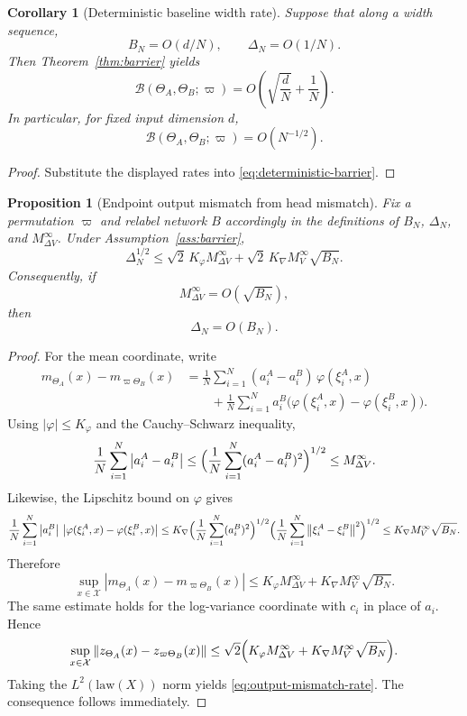 \documentclass[11pt]{article}
\newtheorem{proposition}[theorem]{Proposition}
\newtheorem{corollary}[theorem]{Corollary}
\theoremstyle{definition}
\newcommand{\norm}[1]{\left\lVert #1 \right\rVert}
\newcommand{\abs}[1]{\left\lvert #1 \right\rvert}
\newcommand{\mc}[1]{\mathcal{#1}}
\newcommand{\cB}{\mathcal{B}}
\begin{document}
\begin{corollary}[Deterministic baseline width rate]
\label{cor:baseline-width-rate}
Suppose that along a width sequence,
\[
  B_N=O(d/N),
  \qquad
  \Delta_N=O(1/N).
\]
Then Theorem~\ref{thm:barrier} yields
\[
  \cB(\Theta_A,\Theta_B;\varpi)
  =
  O\!\left(\sqrt{\frac{d}{N}}+\frac1N\right).
\]
In particular, for fixed input dimension $d$,
\[
  \cB(\Theta_A,\Theta_B;\varpi)=O(N^{-1/2}).
\]
\end{corollary}

\begin{proof}
Substitute the displayed rates into \eqref{eq:deterministic-barrier}.
\end{proof}

\begin{proposition}[Endpoint output mismatch from head mismatch]
\label{prop:output-mismatch-rate}
Fix a permutation $\varpi$ and relabel network $B$ accordingly in the
definitions of $B_N$, $\Delta_N$, and $M_{\Delta V}^\infty$. Under
Assumption~\ref{ass:barrier},
\begin{equation}
  \Delta_N^{1/2}
  \le
  \sqrt{2}\,K_\varphi M_{\Delta V}^\infty
  +
  \sqrt{2}\,K_{\nabla}M_V^\infty\sqrt{B_N}.
  \label{eq:output-mismatch-rate}
\end{equation}
Consequently, if
\[
  M_{\Delta V}^\infty=O(\sqrt{B_N}),
\]
then
\[
  \Delta_N=O(B_N).
\]
\end{proposition}

\begin{proof}
For the mean coordinate, write
\begin{align*}
  m_{\Theta_A}(x)-m_{\varpi\Theta_B}(x)
  &=
  \frac1N\sum_{i=1}^N
  (a_i^A-a_i^B)\,\varphi(\xi_i^A,x)
  \\
  &\qquad+
  \frac1N\sum_{i=1}^N
  a_i^B\bigl(\varphi(\xi_i^A,x)-\varphi(\xi_i^B,x)\bigr).
\end{align*}
Using $\abs{\varphi}\le K_\varphi$ and the Cauchy--Schwarz inequality,
\[
  \frac1N\sum_{i=1}^N \abs{a_i^A-a_i^B}
  \le
  \Bigl(\frac1N\sum_{i=1}^N (a_i^A-a_i^B)^2\Bigr)^{1/2}
  \le
  M_{\Delta V}^\infty.
\]
Likewise, the Lipschitz bound on $\varphi$ gives
\[
  \frac1N\sum_{i=1}^N
  \abs{a_i^B}\,\abs{\varphi(\xi_i^A,x)-\varphi(\xi_i^B,x)}
  \le
  K_{\nabla}
  \Bigl(\frac1N\sum_{i=1}^N (a_i^B)^2\Bigr)^{1/2}
  \Bigl(\frac1N\sum_{i=1}^N \norm{\xi_i^A-\xi_i^B}^2\Bigr)^{1/2}
  \le
  K_{\nabla}M_V^\infty\sqrt{B_N}.
\]
Therefore
\[
  \sup_{x\in\mc{X}}
  \abs{m_{\Theta_A}(x)-m_{\varpi\Theta_B}(x)}
  \le
  K_\varphi M_{\Delta V}^\infty
  +
  K_{\nabla}M_V^\infty\sqrt{B_N}.
\]
The same estimate holds for the log-variance coordinate with $c_i$ in place of
$a_i$. Hence
\[
  \sup_{x\in\mc{X}}
  \norm{z_{\Theta_A}(x)-z_{\varpi\Theta_B}(x)}
  \le
  \sqrt{2}
  \Bigl(
    K_\varphi M_{\Delta V}^\infty
    +
    K_{\nabla}M_V^\infty\sqrt{B_N}
  \Bigr).
\]
Taking the $L^2(\mathrm{law}(X))$ norm yields \eqref{eq:output-mismatch-rate}.
The consequence follows immediately.
\end{proof}
\end{document}
